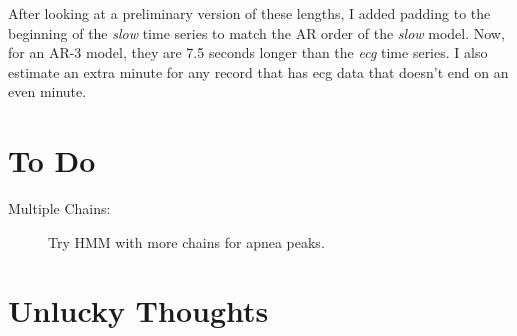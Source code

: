 \documentclass[12pt]{article}
\begin{document}


After looking at a preliminary version of these lengths, I added
padding to the beginning of the \emph{slow} time series to match the
AR order of the \emph{slow} model.  Now, for an AR-3 model, they are
7.5 seconds longer than the \emph{ecg} time series.  I also estimate
an extra minute for any record that has ecg data that doesn't end on
an even minute.

\section{To Do}
\label{sec:todo}

\begin{description}
\item[Multiple Chains:] Try HMM with more chains for apnea peaks.
\end{description}

\section{Unlucky Thoughts}
\label{sec:unlucky}
\end{document}
